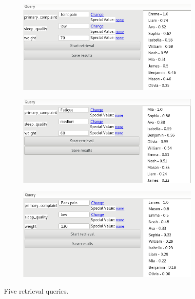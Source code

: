 \documentclass[a4paper]{article}
\begin{document}
\begin{enumerate}[label=\alph*)]
\begin{figure}[H]
                \hfill
                \begin{subfigure}{.47\itemizewidth}%
                    \includegraphics[width=\linewidth]{retrieval3.png}
                    \caption{}
                \end{subfigure}
                \hspace{0.05\itemizewidth}
                \begin{subfigure}{.47\itemizewidth}%
                    \includegraphics[width=\linewidth]{retrieval4.png}
                    \caption{}
                \end{subfigure}

                \vspace{5mm}

                \begin{subfigure}{.47\itemizewidth}%
                    \includegraphics[width=\linewidth]{retrieval5.png}
                    \caption{}
                    \label{fig:retrieval5}
                \end{subfigure}
                \caption{Five retrieval queries.}
            \end{figure}


\end{enumerate}
\end{document}

